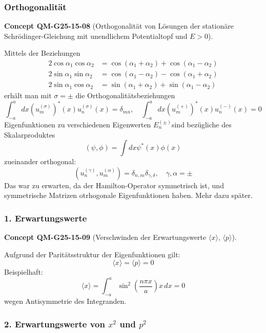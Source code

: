 \documentclass[10pt, letterpaper]{article}
\newcommand{\CustomHeading}[3]{%
  \par\medskip\noindent%
  \textbf{#1 #2} \textnormal{(#3)}.\enskip%
}
\newenvironment{CONC}[2]{\begin{unitbox}\CustomHeading{Concept}{#1}{#2}}{\end{unitbox}}
\begin{document}
\subsubsection*{Orthogonalität}

\begin{CONC}{QM-G25-15-08}{Orthogonalität von Lösungen der stationäre Schrödinger-Gleichung mit unendlichem Potentialtopf und $E>0$}
Mittels der Beziehungen
$$
\begin{aligned}
2 \cos \alpha_{1} \cos \alpha_{2} & =\cos \left(\alpha_{1}+\alpha_{2}\right)+\cos \left(\alpha_{1}-\alpha_{2}\right) \\
2 \sin \alpha_{1} \sin \alpha_{2} & =\cos \left(\alpha_{1}-\alpha_{2}\right)-\cos \left(\alpha_{1}+\alpha_{2}\right) \\
2 \sin \alpha_{1} \cos \alpha_{2} & =\sin \left(\alpha_{1}+\alpha_{2}\right)+\sin \left(\alpha_{1}-\alpha_{2}\right)
\end{aligned}
$$
erhält man mit $\sigma= \pm$ die Orthogonalitätsbeziehungen
$$
\int_{-a}^{a} d x\left(u_{m}^{(\sigma)}\right)^{*}(x) u_{n}^{(\sigma)}(x)=\delta_{m n}, \quad \int_{-a}^{a} d x\left(u_{m}^{(+)}\right)^{*}(x) u_{n}^{(-)}(x)=0
$$
Eigenfunktionen zu verschiedenen Eigenwerten $E_{n}^{( \pm)}$sind bezügliche des Skalarproduktes
$$
(\psi, \phi)=\int d x \psi^{*}(x) \phi(x)
$$
zueinander orthogonal:
$$
\left(u_{n}^{(\gamma)}, u_{m}^{(\alpha)}\right)=\delta_{n, m} \delta_{\gamma, \delta}, \quad \gamma, \alpha= \pm
$$
Das war zu erwarten, da der Hamilton-Operator symmetrisch ist, und symmetrische Matrizen otrhogonale Eigenfunktionen haben. Mehr dazu später.
\end{CONC}


\subsubsection*{1. Erwartungswerte}


\begin{CONC}{QM-G25-15-09}{Verschwinden der Erwartungswerte $\langle x \rangle$, $\langle p \rangle$}
Aufgrund der Paritätsstruktur der Eigenfunktionen gilt:
\[
\langle x \rangle = \langle p \rangle = 0
\]
Beispielhaft:
\[
\langle x \rangle = \int_{-a}^{a} \sin^2\left(\frac{n \pi x}{a}\right) x\, dx = 0
\]
wegen Antisymmetrie des Integranden.
\end{CONC}


\subsubsection*{2. Erwartungswerte von $x^2$ und $p^2$}
\end{document}
